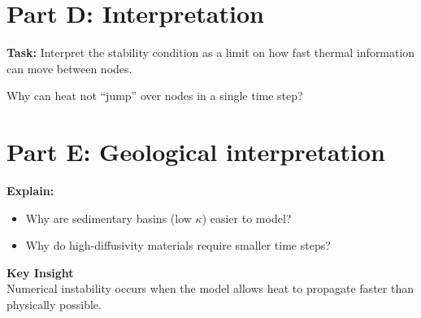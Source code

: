 \documentclass[11pt,a4paper]{article}
\begin{document}
\section*{Part D: Interpretation}

\textbf{Task:}
Interpret the stability condition as a limit on how fast thermal information can move between nodes.

Why can heat not ``jump'' over nodes in a single time step?

\section*{Part E: Geological interpretation}

\textbf{Explain:}
\begin{itemize}
    \item Why are sedimentary basins (low $\kappa$) easier to model?
    \item Why do high-diffusivity materials require smaller time steps?
\end{itemize}

\bigskip

\textbf{Key Insight} \\
Numerical instability occurs when the model allows heat to propagate faster
than physically possible.
\end{document}
